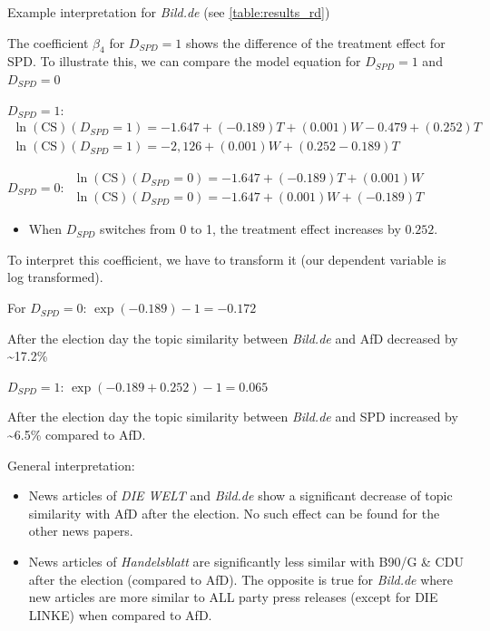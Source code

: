 \documentclass[
]{article}
\providecommand{\tightlist}{%
  \setlength{\itemsep}{0pt}\setlength{\parskip}{0pt}}
\begin{document}
Example interpretation for \emph{Bild.de} (see
\autoref{table:results_rd})

The coefficient \(\beta_4\) for \(D_{SPD} = 1\) shows the difference of
the treatment effect for SPD. To illustrate this, we can compare the
model equation for \(D_{SPD} = 1\) and \(D_{SPD} = 0\)

\(D_{SPD} = 1\):
\(\begin{aligned} \ln(\text{CS})(D_{SPD}=1)=-1.647+(-0.189)T+(0.001)W-0.479+(0.252)T \\ \ln(\text{CS})(D_{SPD}=1)=-2,126+(0.001)W+(0.252-0.189)T \end{aligned}\)

\(D_{SPD} = 0\):
\(\begin{aligned} \ln(\text{CS})(D_{SPD}=0)=-1.647+(-0.189)T+(0.001)W \\ \ln(\text{CS})(D_{SPD}=0)=-1.647+(0.001)W+(-0.189)T \end{aligned}\)

\begin{itemize}
\tightlist
\item
  When \(D_{SPD}\) switches from 0 to 1, the treatment effect increases
  by \(0.252\).
\end{itemize}

To interpret this coefficient, we have to transform it (our dependent
variable is log transformed).

For \(D_{SPD} = 0\): \(\exp(-0.189)-1 = -0.172\)

After the election day the topic similarity between \emph{Bild.de} and
AfD decreased by \textasciitilde17.2\%

\(D_{SPD} = 1\): \(\exp(-0.189+0.252)-1 = 0.065\)

After the election day the topic similarity between \emph{Bild.de} and
SPD increased by \textasciitilde6.5\% compared to AfD.

General interpretation:

\begin{itemize}
\tightlist
\item
  News articles of \emph{DIE WELT} and \emph{Bild.de} show a significant
  decrease of topic similarity with AfD after the election. No such
  effect can be found for the other news papers.
\item
  News articles of \emph{Handelsblatt} are significantly less similar
  with B90/G \& CDU after the election (compared to AfD). The opposite
  is true for \emph{Bild.de} where new articles are more similar to ALL
  party press releases (except for DIE LINKE) when compared to AfD.
\end{itemize}
\end{document}
